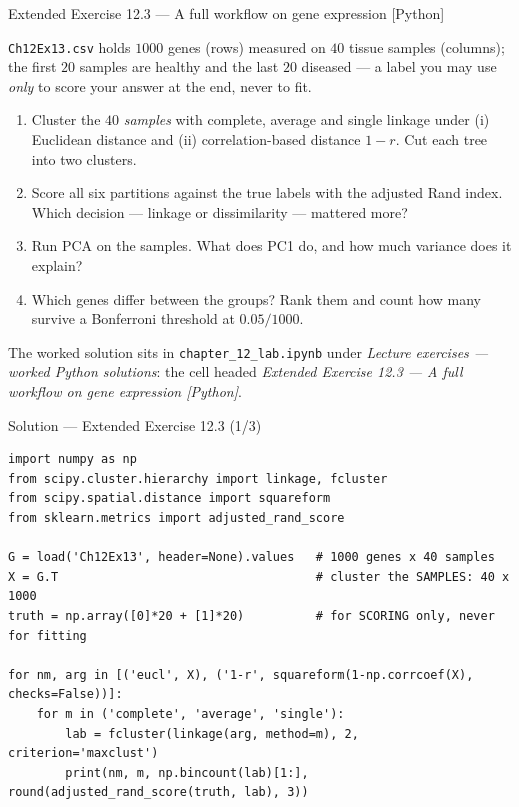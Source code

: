 \documentclass[aspectratio=169,11pt]{beamer}
\begin{document}
\begin{frame}{Extended Exercise 12.3 --- A full workflow on gene expression [Python]}
  \footnotesize
\begin{longexercise}
  \texttt{Ch12Ex13.csv} holds $1000$ genes (rows) measured on $40$ tissue samples
  (columns); the first $20$ samples are healthy and the last $20$ diseased --- a label you
  may use \emph{only} to score your answer at the end, never to fit.
  \begin{enumerate}
    \item Cluster the $40$ \emph{samples} with complete, average and single linkage under
          (i) Euclidean distance and (ii) correlation-based distance $1-r$. Cut each tree
          into two clusters.
    \item Score all six partitions against the true labels with the adjusted Rand index.
          Which decision --- linkage or dissimilarity --- mattered more?
    \item Run PCA on the samples. What does PC1 do, and how much variance does it explain?
    \item Which genes differ between the groups? Rank them and count how many survive a
          Bonferroni threshold at $0.05/1000$.
  \end{enumerate}
\end{longexercise}
\begin{labnote}
  The worked solution sits in \texttt{chapter\_12\_lab.ipynb} under
  \emph{Lecture exercises --- worked Python solutions}: the cell headed
  \emph{Extended Exercise 12.3 --- A full workflow on gene expression [Python]}.
\end{labnote}
\end{frame}

\begin{frame}[fragile]{Solution --- Extended Exercise 12.3 (1/3)}
\begin{solutionbox}
\begin{lstlisting}[basicstyle=\ttfamily\scriptsize]
import numpy as np
from scipy.cluster.hierarchy import linkage, fcluster
from scipy.spatial.distance import squareform
from sklearn.metrics import adjusted_rand_score

G = load('Ch12Ex13', header=None).values   # 1000 genes x 40 samples
X = G.T                                    # cluster the SAMPLES: 40 x 1000
truth = np.array([0]*20 + [1]*20)          # for SCORING only, never for fitting

for nm, arg in [('eucl', X), ('1-r', squareform(1-np.corrcoef(X), checks=False))]:
    for m in ('complete', 'average', 'single'):
        lab = fcluster(linkage(arg, method=m), 2, criterion='maxclust')
        print(nm, m, np.bincount(lab)[1:], round(adjusted_rand_score(truth, lab), 3))
\end{lstlisting}
\end{solutionbox}
\end{frame}
\end{document}
